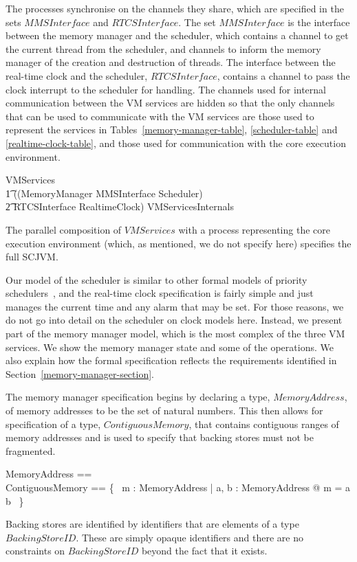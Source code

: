 \documentclass[a4paper,10pt]{report}
\begin{document}
The processes synchronise on the channels they share, which are
specified in the sets $MMSInterface$ and $RTCSInterface$.
The set $MMSInterface$ is the interface between the memory manager and
the scheduler, which contains a channel to get the current thread from
the scheduler, and channels to inform the memory manager of the
creation and destruction of threads.
The interface between the real-time clock and the scheduler,
$RTCSInterface$, contains a channel to pass the clock interrupt to the
scheduler for handling.
The channels used for internal communication between the VM services
are hidden so that the only channels that can be used to communicate
with the VM services are those used to represent the services in
Tables~\ref{memory-manager-table}, \ref{scheduler-table} and
\ref{realtime-clock-table}, and those used for communication with the
core execution environment.
%
\begin{circus}
  VMServices \circdef \\
  \t1 ((MemoryManager \lpar MMSInterface \rpar Scheduler) \\
  \t2 \lpar RTCSInterface \rpar RealtimeClock) \circhide
  VMServicesInternals
\end{circus}
%
The parallel composition of $VMServices$ with a process representing
the core execution environment (which, as mentioned, we do not specify
here) specifies the full SCJVM.

Our model of the scheduler is similar to other formal models of
priority schedulers~\cite{ferreira2014, gotsman2013, klein2014,
  lime2009}, and the real-time clock specification is fairly simple
and just manages the current time and any alarm that may be set.
For those reasons, we do not go into detail on the scheduler on clock
models here.
Instead, we present part of the memory manager model, which is the
most complex of the three VM services.
We show the memory manager state and some of the operations.
We also explain how the formal specification reflects the requirements
identified in Section~\ref{memory-manager-section}.

The memory manager specification begins by declaring a type,
$MemoryAddress$, of memory addresses to be the set of natural numbers.
This then allows for specification of a type, $ContiguousMemory$, that
contains contiguous ranges of memory addresses and is used to specify
that backing stores must not be fragmented.
%
\begin{zed}
  MemoryAddress == \nat \\
  ContiguousMemory == \{~ m : \power MemoryAddress | \exists a, b :
  MemoryAddress @ m = a \upto b ~\}
\end{zed}
%
Backing stores are identified by identifiers that are elements of a
type $BackingStoreID$.
These are simply opaque identifiers and there are no constraints on
$BackingStoreID$ beyond the fact that it exists.
\end{document}
